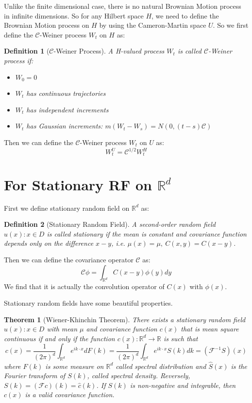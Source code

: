 \documentclass{article}
\newtheorem{theorem}{Theorem}
\newtheorem{definition}{Definition}
\begin{document}
Unlike the finite dimensional case, there is no natural Brownian Motion process in infinite dimensions. 
So for any Hilbert space $H$, we need to define the Brownian Motion process on $H$ by using the Cameron-Martin space $U$.
So we first define the $\mathcal{C}$-Weiner process $W_t$ on $H$ as:
\begin{definition}[$\mathcal{C}$-Weiner Process]
  A H-valued process $W_t$ is called $\mathcal{C}$-Weiner process if:
  \begin{itemize}
    \item $W_0 = 0$
    \item $W_t$ has continuous trajectories
    \item $W_t$ has independent increments
    \item $W_t$ has Gaussian increments: $m(W_t - W_s) = N(0, (t-s)\mathcal{C})$
  \end{itemize}
\end{definition}
Then we can define the $\mathcal{C}$-Weiner process $W_t$ on $U$ as:
\begin{equation}
  W^U_t = \mathcal{C}^{1/2}W^H_t
\end{equation}


\section{For Stationary RF on $\mathbb{R}^d$}
First we define stationary random field on $\mathbb{R}^d$ as:
\begin{definition}[Stationary Random Field]
  A second-order random field ${u(x): x\in D}$ is called stationary if the mean is constant and covariance function 
  depends only on the difference $x-y$, i.e. $\mu(x) = \mu,\ C(x, y) = C(x-y)$.
\end{definition}
Then we can define the covariance operator $\mathcal{C}$ as:
\begin{equation}
  \mathcal{C}\phi = \int_{\mathbb{R}^d} C(x-y)\phi(y)dy
\end{equation}
We find that it is actually the convolution operator of $C(x)$ with $\phi(x)$.

Stationary random fields have some beautiful properties.
\begin{theorem}[Wiener-Khinchin Theorem]
    There exists a stationary random field ${u(x): x\in D}$ with mean $\mu$ and covariance function $c(x)$ that is mean square continuous if and only if 
    the function $c(x): \mathbb{R}^d\rightarrow \mathbb{R}$ is such that 
    \begin{equation}
        c(x) = \frac{1}{(2\pi)^{d}}\int_{\mathbb{R}^d} e^{ik \cdot x}dF(k)=\frac{1}{(2\pi)^{d}}\int_{\mathbb{R}^d} e^{ik \cdot x}S(k)dk = \left(\mathcal{F}^{-1}S\right)(x)
    \end{equation}
    where $F(k)$ is some measure on $\mathbb{R}^d$ called spectral distribution and $\hat{S}(x)$ is the Fourier transform of $S(k)$, 
	called spectral density.
    Reversely, $S(k) = \left(\mathcal{F}c\right)(k) = \hat{c}(k)$.
    If $S(k)$ is non-negative and integrable, then $c(x)$ is a valid covariance function.
\end{theorem}
\end{document}
